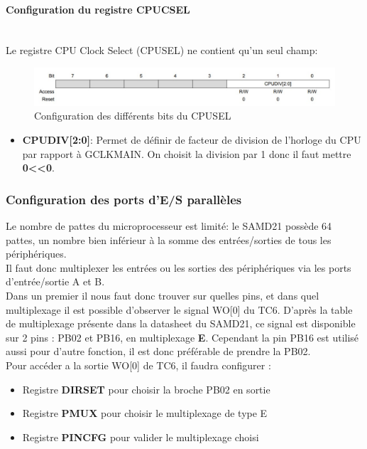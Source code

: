 \documentclass[a4paper]{article}
\begin{document}
	\paragraph{Configuration du registre CPUCSEL} 
	~~\\
	Le registre CPU Clock Select (CPUSEL) ne contient qu'un seul champ:
	\begin{figure}[H]
		\centering
		\includegraphics[width=0.9\linewidth]{CPUSEL.jpg}
		\caption{Configuration des différents bits du CPUSEL}
	\end{figure}
	\begin{itemize}
		\item {\bf CPUDIV[2:0]}: Permet de définir de facteur de division de l'horloge du CPU par rapport à GCLKMAIN. On choisit la division par 1 donc il faut mettre {\bf 0\textless\textless0}.~~\\
	\end{itemize}
	
	\subsubsection{Configuration des ports d'E/S parallèles} 
	Le nombre de pattes du microprocesseur est limité: le SAMD21 possède 64 pattes, un nombre bien inférieur à la somme des entrées/sorties de tous les périphériques.\\
    Il faut donc multiplexer les entrées ou les sorties des périphériques via les ports d’entrée/sortie A et B.\\
    Dans un premier il nous faut donc trouver sur quelles pins, et dans quel multiplexage il est possible d’observer le signal WO[0] du TC6. D’après la table de multiplexage présente dans la datasheet du SAMD21, ce signal est disponible sur 2 pins : PB02 et PB16, en multiplexage {\bf E}. Cependant la pin PB16 est utilisé aussi pour d’autre fonction, il est donc préférable de prendre la PB02.\\
    Pour accéder a la sortie WO[0] de TC6, il faudra configurer :
    \begin{itemize}
		\item {Registre \bf DIRSET} pour choisir la broche PB02 en sortie
		\item {Registre \bf PMUX} pour choisir le multiplexage de type E
		\item {Registre \bf PINCFG} pour valider le multiplexage choisi
	\end{itemize}
	
\end{document}
